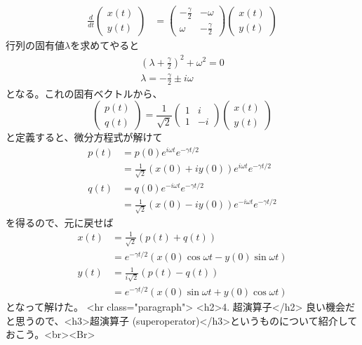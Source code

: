 \begin{align}
\frac{d}{dt}\left(\begin{array}{c} x(t)\\y(t)\end{array}\right) &= 
\left(\begin{array}{cc} -\frac{\gamma}{2}& -\omega \\ \omega & -\frac{\gamma}{2}\end{array}\right)\left(\begin{array}{c} x(t)\\y(t)\end{array}\right)
\end{align}
行列の固有値\(\lambda\)を求めてやると
\begin{align}
\left(\lambda + \frac{\gamma}{2}\right)^2+\omega^2=0 \\
\lambda = -\frac{\gamma}{2} \pm i\omega
\end{align}
となる。これの固有ベクトルから、
\[
\left(\begin{array}{c} p(t)\\q(t)\end{array}\right) = \frac{1}{\sqrt{2}}\left(\begin{array}{cc} 1& i \\ 1 & -i\end{array}\right)\left(\begin{array}{c} x(t)\\y(t)\end{array}\right)
\]
と定義すると、微分方程式が解けて
\begin{align}
p(t) &= p(0)e^{i\omega t}e^{-\gamma t/2}\\ &= \frac{1}{\sqrt{2}}(x(0)+iy(0))e^{i\omega t}e^{-\gamma t/2}\\
q(t) &= q(0)e^{-i\omega t}e^{-\gamma t/2}\\ &= \frac{1}{\sqrt{2}}(x(0)-iy(0))e^{-i\omega t}e^{-\gamma t/2}
\end{align}
を得るので、元に戻せば
\begin{align}
x(t) &= \frac{1}{\sqrt{2}}(p(t)+q(t)) \\&= e^{-\gamma t/2}(x(0)\cos\omega t - y(0)\sin\omega t) \\
y(t) &= \frac{1}{i\sqrt{2}}(p(t)-q(t)) \\&= e^{-\gamma t/2}(x(0)\sin\omega t + y(0)\cos\omega t)
\end{align}
となって解けた。
<hr class="paragraph">
<h2>4. 超演算子</h2>
良い機会だと思うので、<h3>超演算子 (superoperator)</h3>というものについて紹介しておこう。<br><Br>
